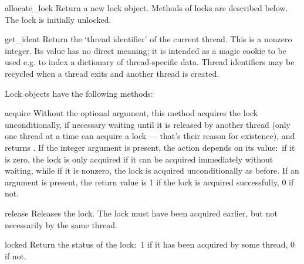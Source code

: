 \begin{funcdesc}{allocate_lock}{}
Return a new lock object.  Methods of locks are described below.  The
lock is initially unlocked.
\end{funcdesc}

\begin{funcdesc}{get_ident}{}
Return the `thread identifier' of the current thread.  This is a
nonzero integer.  Its value has no direct meaning; it is intended as a
magic cookie to be used e.g. to index a dictionary of thread-specific
data.  Thread identifiers may be recycled when a thread exits and
another thread is created.
\end{funcdesc}

Lock objects have the following methods:

\renewcommand{\indexsubitem}{(lock method)}
\begin{funcdesc}{acquire}{}
Without the optional argument, this method acquires the lock
unconditionally, if necessary waiting until it is released by another
thread (only one thread at a time can acquire a lock --- that's their
reason for existence), and returns .  If the integer
 argument is present, the action depends on its value:\
if it is zero, the lock is only acquired if it can be acquired
immediately without waiting, while if it is nonzero, the lock is
acquired unconditionally as before.  If an argument is present, the
return value is 1 if the lock is acquired successfully, 0 if not.
\end{funcdesc}

\begin{funcdesc}{release}{}
Releases the lock.  The lock must have been acquired earlier, but not
necessarily by the same thread.
\end{funcdesc}

\begin{funcdesc}{locked}{}
Return the status of the lock:\ 1 if it has been acquired by some
thread, 0 if not.
\end{funcdesc}



